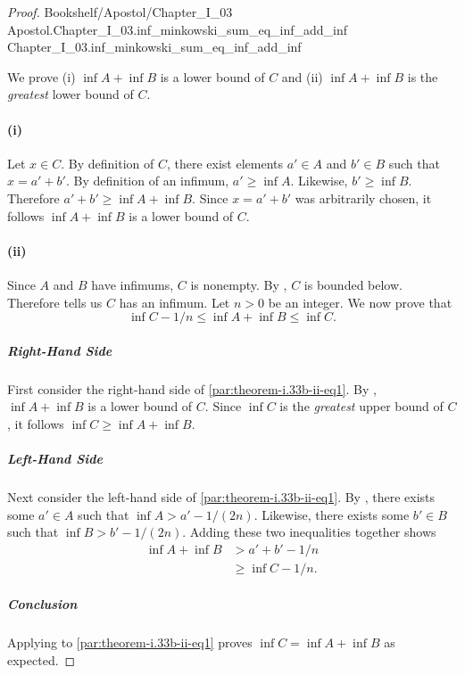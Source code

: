 \documentclass{article}
\newcommand{\link}[1]{\lean{../..}
  {Bookshelf/Apostol/Chapter\_I\_03} %
  {Apostol.Chapter\_I\_03.#1} %
  {Chapter\_I\_03.#1} %
}
\begin{document}
\begin{proof}

  \link{inf\_minkowski\_sum\_eq\_inf\_add\_inf}

  \divider

  We prove (i) $\inf{A} + \inf{B}$ is a lower bound of $C$ and (ii)
    $\inf{A} + \inf{B}$ is the \textit{greatest} lower bound of $C$.

  \paragraph{(i)}%

    Let $x \in C$.
    By definition of $C$, there exist elements $a' \in A$ and $b' \in B$ such
      that $x = a' + b'$.
    By definition of an infimum, $a' \geq \inf{A}$.
    Likewise, $b' \geq \inf{B}$.
    Therefore $a' + b' \geq \inf{A} + \inf{B}$.
    Since $x = a' + b'$ was arbitrarily chosen, it follows $\inf{A} + \inf{B}$
      is a lower bound of $C$.

  \paragraph{(ii)}%

    Since $A$ and $B$ have infimums, $C$ is nonempty.
    By , $C$ is bounded below.
    Therefore  tells us $C$ has an infimum.
    Let $n > 0$ be an integer.
    We now prove that
      \begin{equation}
        \label{par:theorem-i.33b-ii-eq1}
        \inf{C} - 1 / n \leq \inf{A} + \inf{B} \leq \inf{C}.
      \end{equation}

    \subparagraph{Right-Hand Side}%

      First consider the right-hand side of \eqref{par:theorem-i.33b-ii-eq1}.
      By , $\inf{A} + \inf{B}$ is a lower bound of
        $C$.
      Since $\inf{C}$ is the \textit{greatest} upper bound of $C$, it follows
        $\inf{C} \geq \inf{A} + \inf{B}$.

    \subparagraph{Left-Hand Side}%

      Next consider the left-hand side of \eqref{par:theorem-i.33b-ii-eq1}.
      By , there exists some $a' \in A$ such that
        $\inf{A} > a' - 1 / (2n)$.
      Likewise, there exists some $b' \in B$ such that
        $\inf{B} > b' - 1 / (2n)$.
      Adding these two inequalities together shows
        \begin{align*}
          \inf{A} + \inf{B}
            & > a' + b' - 1 / n \\
            & \geq \inf{C} - 1 / n.
        \end{align*}

    \subparagraph{Conclusion}%

      Applying  to \eqref{par:theorem-i.33b-ii-eq1}
        proves $\inf{C} = \inf{A} + \inf{B}$ as expected.

\end{proof}
\end{document}
